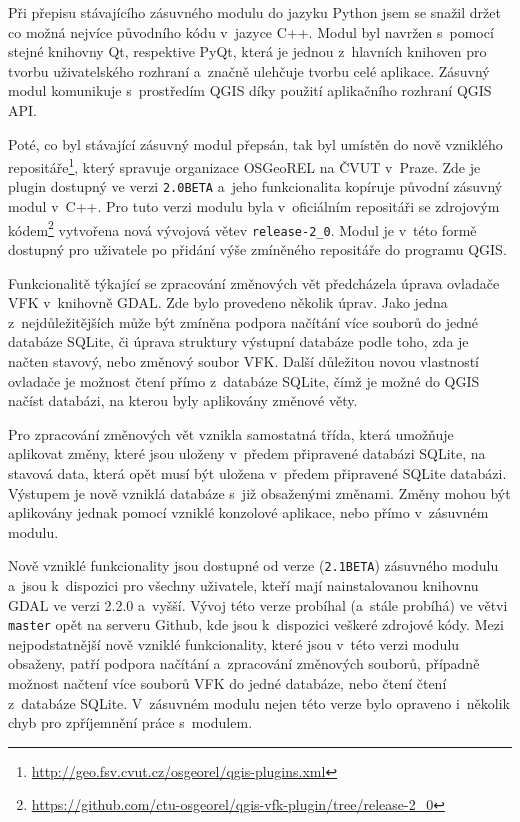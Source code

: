 \documentclass[a4paper,12pt,oneside]{book}
\begin{document}
Při přepisu stávajícího zásuvného modulu do jazyku Python jsem se snažil držet co možná nejvíce původního kódu v~jazyce C++. Modul byl navržen s~pomocí stejné knihovny Qt, respektive PyQt, která je jednou z~hlavních knihoven pro tvorbu uživatelského rozhraní a~značně ulehčuje tvorbu celé aplikace. Zásuvný modul komunikuje s~prostředím QGIS díky použití aplikačního rozhraní QGIS API.

Poté, co byl stávající zásuvný modul přepsán, tak byl umístěn do nově vzniklého repositáře\footnote{\url{http://geo.fsv.cvut.cz/osgeorel/qgis-plugins.xml}}, který spravuje organizace OSGeoREL na ČVUT v~Praze. Zde je plugin dostupný ve verzi \texttt{2.0BETA} a~jeho funkcionalita kopíruje původní zásuvný modul v~C++. Pro tuto verzi modulu byla v~oficiálním repositáři se zdrojovým kódem\footnote{\url{https://github.com/ctu-osgeorel/qgis-vfk-plugin/tree/release-2_0}} vytvořena nová vývojová větev \texttt{release-2\_0}. Modul je v~této formě dostupný pro uživatele po přidání výše zmíněného repositáře do programu QGIS.

Funkcionalitě týkající se zpracování změnových vět předcházela úprava ovladače VFK v~knihovně GDAL. Zde bylo provedeno několik úprav. Jako jedna z~nejdůležitějších může být zmíněna podpora načítání více souborů do jedné databáze SQLite, či úprava struktury výstupní databáze podle toho, zda je načten stavový, nebo změnový soubor VFK. Další důležitou novou vlastností ovladače je možnost čtení přímo z~databáze SQLite, čímž je možné do QGIS načíst databázi, na kterou byly aplikovány změnové věty.

Pro zpracování změnových vět vznikla samostatná třída, která umožňuje aplikovat změny, které jsou uloženy v~předem připravené databázi SQLite, na stavová data, která opět musí být uložena v~předem připravené SQLite databázi. Výstupem je nově vzniklá databáze s~již obsaženými změnami. Změny mohou být aplikovány jednak pomocí vzniklé konzolové aplikace, nebo přímo v~zásuvném modulu.

Nově vzniklé funkcionality jsou dostupné od verze (\texttt{2.1BETA}) zásuvného modulu a~jsou k~dispozici pro všechny uživatele, kteří mají nainstalovanou knihovnu GDAL ve verzi 2.2.0 a~vyšší. Vývoj této verze probíhal (a~stále probíhá) ve větvi \texttt{master} opět na serveru Github, kde jsou k~dispozici veškeré zdrojové kódy. Mezi nejpodstatnější nově vzniklé funkcionality, které jsou v~této verzi modulu obsaženy, patří podpora načítání a~zpracování změnových souborů, případně možnost načtení více souborů VFK do jedné databáze, nebo čtení čtení z~databáze SQLite. V~zásuvném modulu nejen této verze bylo opraveno i~několik chyb pro zpříjemnění práce s~modulem. 
\end{document}
